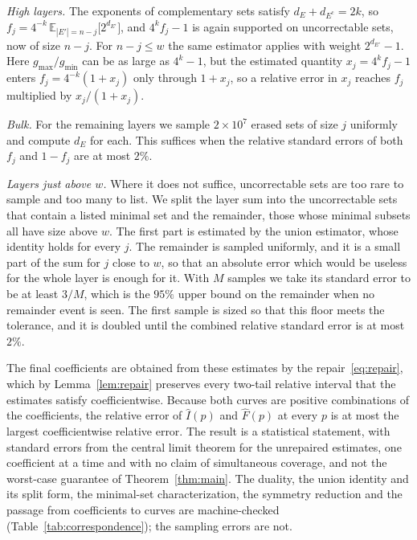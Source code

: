\documentclass[11pt]{article}
\theoremstyle{remark}
\newcommand{\E}{\mathbb E}
\begin{document}
\emph{High layers.} The exponents of complementary sets satisfy
\(d_E+d_{E^{\mathrm c}}=2k\), so
\(f_j=4^{-k}\,\E_{|E'|=n-j}\bigl[2^{d_{E'}}\bigr]\), and
\(4^kf_j-1\) is again supported on uncorrectable sets, now of size
\(n-j\). For \(n-j\le w\) the same estimator applies with weight
\(2^{d_{E'}}-1\). Here \(g_{\max}/g_{\min}\) can be as large as
\(4^k-1\), but the estimated quantity \(x_j=4^kf_j-1\) enters
\(f_j=4^{-k}(1+x_j)\) only through \(1+x_j\), so a relative error in
\(x_j\) reaches \(f_j\) multiplied by \(x_j/(1+x_j)\).

\emph{Bulk.} For the remaining layers we sample \(2\times10^7\) erased
sets of size \(j\) uniformly and compute \(d_E\) for each. This suffices
when the relative standard errors of both \(f_j\) and \(1-f_j\) are at
most \(2\%\).

\emph{Layers just above \(w\).} Where it does not suffice, uncorrectable
sets are too rare to sample and too many to list. We split the layer
sum into the uncorrectable sets that contain a listed minimal set and
the remainder, those whose minimal subsets all have size above \(w\).
The first part is estimated by the union estimator, whose identity holds
for every \(j\). The remainder is sampled uniformly, and it is a small
part of the sum for \(j\) close to \(w\), so that an absolute error
which would be useless for the whole layer is enough for it. With \(M\)
samples we take its standard error to be at least \(3/M\), which is the
\(95\%\) upper bound on the remainder when no remainder event is seen.
The first sample is sized so that this floor meets the tolerance, and it
is doubled until the combined relative standard error is at most
\(2\%\).

The final coefficients are obtained from these estimates by the
repair~\eqref{eq:repair}, which by Lemma~\ref{lem:repair} preserves every
two-tail relative interval that the estimates satisfy coefficientwise.
Because both curves are positive combinations of the
coefficients, the relative error of \(\widehat I(p)\) and
\(\widehat F(p)\) at every \(p\) is at most the largest coefficientwise
relative error. The result is a statistical statement, with standard
errors from the central limit theorem for the unrepaired estimates, one
coefficient at a time and with no claim of simultaneous coverage, and
not the worst-case guarantee of Theorem~\ref{thm:main}. The
duality, the union identity and its split form, the minimal-set
characterization, the symmetry reduction and the passage from
coefficients to curves are machine-checked
(Table~\ref{tab:correspondence}); the sampling errors are not.
\end{document}
